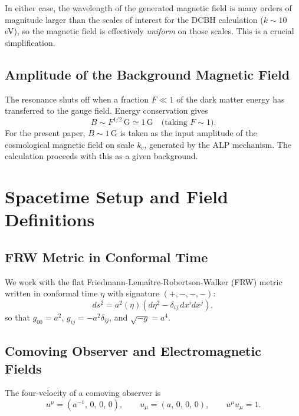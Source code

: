 \documentclass[12pt,a4paper]{report}
\newcommand{\kc}{k_{\mathrm{c}}}
\theoremstyle{definition}
\begin{document}
In either case, the wavelength of the generated magnetic field is many orders of
magnitude larger than the scales of interest for the DCBH calculation ($k\sim 10$\,eV),
so the magnetic field is effectively \emph{uniform} on those scales. This is a
crucial simplification.

\section{Amplitude of the Background Magnetic Field}

The resonance shuts off when a fraction $F\ll 1$ of the dark matter energy has
transferred to the gauge field. Energy conservation gives
\begin{equation}
  B \sim F^{1/2}\,\mathrm{G} \simeq 1\,\mathrm{G}
  \quad\text{(taking }F\sim 1\text{)}.
  \label{eq:B_amplitude}
\end{equation}
For the present paper, $B\sim 1\,\mathrm{G}$ is taken as the input amplitude of the
cosmological magnetic field on scale $\kc$, generated by the ALP mechanism. The
calculation proceeds with this as a given background.

\chapter{Spacetime Setup and Field Definitions}

\section{FRW Metric in Conformal Time}

We work with the flat Friedmann-Lema\^{i}tre-Robertson-Walker (FRW) metric written
in conformal time $\eta$ with signature $(+,-,-,-)$:
\begin{equation}
  ds^2 = a^2(\eta)\left(d\eta^2 - \delta_{ij}\,dx^i dx^j\right),
  \label{eq:metric}
\end{equation}
so that $g_{00}=a^2$, $g_{ij}=-a^2\delta_{ij}$, and $\sqrt{-g}=a^4$.

\section{Comoving Observer and Electromagnetic Fields}

The four-velocity of a comoving observer is
\begin{equation}
  u^\mu = \left(a^{-1},\,0,\,0,\,0\right),
  \qquad
  u_\mu = \left(a,\,0,\,0,\,0\right),
  \qquad u^\mu u_\mu = 1.
\end{equation}
\end{document}
